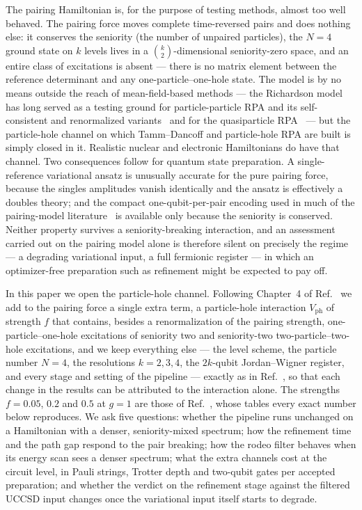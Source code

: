\documentclass[
  aps,            %
  prc,            %
  reprint,        %
  superscriptaddress,
  floatfix,
  nofootinbib
]{revtex4-2}
\newcommand{\Vph}{V_{\mathrm{ph}}}
\begin{document}
The pairing Hamiltonian is, for the purpose of testing methods, almost too
well behaved.  The pairing force moves complete time-reversed pairs and does
nothing else: it conserves the seniority (the number of unpaired particles),
the $N=4$ ground state on $k$ levels lives in a $\binom{k}{2}$-dimensional
seniority-zero space, and an entire class of excitations is absent --- there
is no matrix element between the reference determinant and any
one-particle--one-hole state.  The model is by no means outside the reach of
mean-field-based methods --- the Richardson model has long served as a
testing ground for particle-particle RPA and its self-consistent and
renormalized variants~\cite{Hirsch2002,Dang2006} and for the quasiparticle
RPA~\cite{RingSchuck} --- but the particle-hole channel on which
Tamm--Dancoff and particle-hole RPA are built is simply closed in it.
Realistic nuclear and electronic Hamiltonians do have that channel.  Two
consequences follow for quantum state preparation.  A single-reference
variational ansatz is unusually accurate for the pure pairing force, because
the singles amplitudes vanish identically and the ansatz is effectively a
doubles theory; and the compact one-qubit-per-pair encoding used in much of
the pairing-model literature~\cite{Lacroix2020,AychetClaisse2026} is
available only because the seniority is conserved.  Neither property
survives a seniority-breaking interaction, and an assessment carried out
on the pairing model alone is therefore silent on precisely the regime ---
a degrading variational input, a full fermionic register --- in which an
optimizer-free preparation such as refinement might be expected to pay off.

In this paper we open the particle-hole channel.  Following Chapter~4 of
Ref.~\cite{MHJbook} we add to the pairing force a single extra term, a
particle-hole interaction $\Vph$ of strength $f$ that contains, besides a
renormalization of the pairing strength, one-particle--one-hole excitations
of seniority two and seniority-two two-particle--two-hole excitations, and
we keep everything else --- the level scheme, the particle number $N=4$, the
resolutions $k=2,3,4$, the $2k$-qubit Jordan--Wigner register, and every
stage and setting of the pipeline --- exactly as in
Ref.~\cite{PairingCompanion}, so that each change in the results can be
attributed to the interaction alone.  The strengths $f=0.05$, $0.2$ and
$0.5$ at $g=1$ are those of Ref.~\cite{MHJbook}, whose tables every exact
number below reproduces.  We ask five questions: whether the pipeline runs
unchanged on a Hamiltonian with a denser, seniority-mixed spectrum; how the
refinement time and the path gap respond to the pair breaking; how the rodeo
filter behaves when its energy scan sees a denser spectrum; what the extra
channels cost at the circuit level, in Pauli strings, Trotter depth and
two-qubit gates per accepted preparation; and whether the verdict on the
refinement stage against the filtered UCCSD input changes once the
variational input itself starts to degrade.
\end{document}
